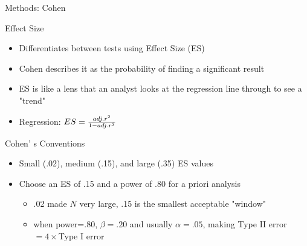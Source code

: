 \begin{frame}{Methods: Cohen}
			\begin{block}{Effect Size}
				\begin{itemize}
					\item Differentiates between tests using Effect  Size (ES)
					\item Cohen describes it as the probability of finding a significant result
					\item ES is like a lens that an analyst looks  at the regression line through to see a "trend" %
					\item Regression: $ES = {adj. r^2 \over {1-adj. r^2}}$ %
				\end{itemize}
			\end{block}
			\begin{block}{Cohen' s Conventions}
				\begin{itemize}
					\item Small (.02), medium (.15), and large (.35) ES values 
					\item Choose an ES of .15 and a power of .80 for a priori analysis 
					\begin{itemize}
						\item .02 made $N$ very large, .15 is the smallest acceptable "window"
						\item when power=.80, $\beta=.20$ and usually $\alpha=.05$, making Type II error $ = 4 \times $Type I error
					\end{itemize}
				\end{itemize}
			\end{block}
		\end{frame}